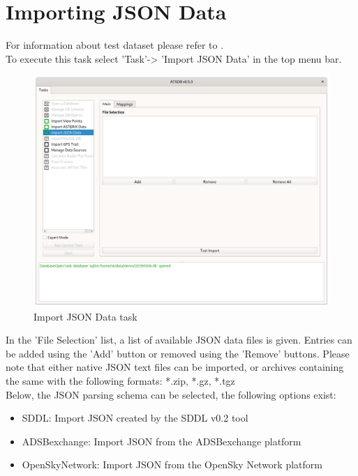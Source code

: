 \section{Importing JSON Data}
\label{sec:json_import}

For information about test dataset please refer to . \\

To execute this task select 'Task'->  'Import JSON Data' in the top menu bar.

\begin{figure}[H]
  \center
    \includegraphics[width=14cm,frame]{../screenshots/import_json_data.png}
  \caption{Import JSON Data task}
\end{figure}

In the 'File Selection' list, a list of available JSON data files is given. Entries can be added using the 'Add' button or removed using the 'Remove' buttons. Please note that either native JSON text files can be imported, or archives containing the same with the following formats: *.zip, *.gz, *.tgz \\

Below, the JSON parsing schema can be selected, the following options exist:
\begin{itemize}  
\item SDDL: Import JSON created by the SDDL v0.2 tool
\item ADSBexchange: Import JSON from the ADSBexchange platform
\item OpenSkyNetwork: Import JSON from the OpenSky Network platform
\end{itemize}

